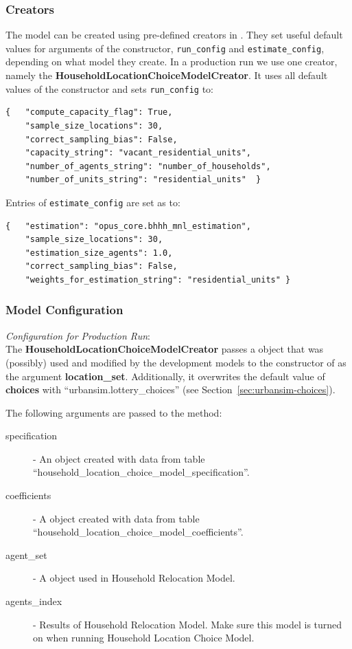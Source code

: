 \subsubsection{Creators}
The model can be created using pre-defined creators in .
They set useful default values for arguments of the
 \modelsindex constructor, \verb|run_config| and
\verb|estimate_config|, depending on what model \modelsindex they create. In a production run we use one creator, namely the
{\bf HouseholdLocationChoiceModelCreator}. \modelsindex  It uses all default
  values of the  \modelsindex constructor and sets
  \verb|run_config| to:
\begin{verbatim}
{   "compute_capacity_flag": True,
    "sample_size_locations": 30,
    "correct_sampling_bias": False,
    "capacity_string": "vacant_residential_units",
    "number_of_agents_string": "number_of_households",
    "number_of_units_string": "residential_units"  }
\end{verbatim}
Entries of \verb|estimate_config| are set as to:
\begin{verbatim}
{   "estimation": "opus_core.bhhh_mnl_estimation",
    "sample_size_locations": 30,
    "estimation_size_agents": 1.0,
    "correct_sampling_bias": False,
    "weights_for_estimation_string": "residential_units" }
\end{verbatim}

\subsubsection{Model Configuration}
\modelsindex
%
{\em Configuration for Production Run}:\\[1mm]
The {\bf HouseholdLocationChoiceModelCreator} passes a
 object that was (possibly) used and modified by the
development models \modelsindex to the constructor of  \modelsindex as
the argument {\bf location_set}. Additionally, it overwrites the default
value of {\bf choices} with ``urbansim.lottery_choices'' (see
Section~\ref{sec:urbansim-choices}).

The following arguments are passed to
  the  method:
\begin{description}
\item[specification] - An  object created with
  data from table ``household_location_choice_model_specification''. \modelsindex
\item[coefficients] \coefficientsindex - A  \coefficientsindex object created with data from
  table ``household_location_choice_model_coefficients''. \modelsindex
\item[agent_set] - A  object used in Household Relocation
  Model. \modelsindex
\item[agents_index] - Results of Household Relocation Model. \modelsindex Make sure this model is turned on 
when running Household Location Choice Model.
\end{description}


